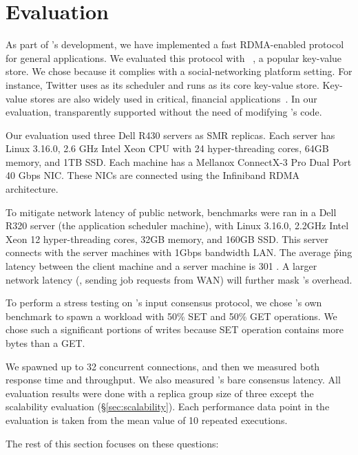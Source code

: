 \section{Evaluation} \label{sec:eval}

As part of \xxx's development, we have implemented a fast RDMA-enabled \paxos 
protocol~\cite{falcon:github} for general applications. We evaluated this 
protocol with \redis~\cite{redis}, a popular key-value store. We chose \redis 
because it complies with a social-networking platform setting. For instance, 
Twitter uses \mesos as its scheduler and runs \redis as its core key-value 
store. Key-value stores are also widely used in critical, financial 
applications~\cite{nosql:finance,nosql:racs14}. In our evaluation, \xxx 
transparently supported \redis without the need of modifying \redis's code. 

Our evaluation used three Dell R430 servers as SMR replicas. Each server has 
Linux 3.16.0, 2.6 GHz Intel Xeon CPU with 24 hyper-threading cores, 64GB 
memory, and 1TB SSD. Each machine has a Mellanox ConnectX-3 Pro Dual Port 40 
Gbps NIC. These NICs are connected using the Infiniband RDMA architecture.

To mitigate network latency of public network, benchmarks were ran 
in a Dell R320 server (the application scheduler machine), with Linux 3.16.0, 
2.2GHz Intel Xeon 12 hyper-threading cores, 32GB memory, and 160GB SSD. This 
server connects with the server machines with 1Gbps bandwidth LAN. The average 
\v{ping} latency between the client machine and a server machine is 301 \us. A 
larger network latency (\eg, sending job requests from WAN) will further 
mask \xxx's overhead.

To perform a stress testing on \xxx's input consensus protocol, we chose 
\redis's own benchmark to spawn a workload with 50\% SET and 50\% GET 
operations. We chose such a significant portions of writes because SET 
operation contains more bytes than a GET.

We spawned up to 32 concurrent connections, and then we measured both response 
time and throughput. We also measured \xxx's bare consensus latency. All 
evaluation results were done with a replica group size of three except the 
scalability evaluation (\S\ref{sec:scalability}). Each performance data point 
in the evaluation is taken from the mean value of 10 repeated executions.

The rest of this section focuses on these questions:


